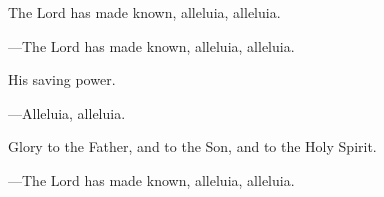 \responsory

\begin{hangpar}
The Lord has made known, alleluia, alleluia.

{\color{red}---\thinspace }The Lord has made known, alleluia, alleluia.

\medskip His saving power.

{\color{red}---\thinspace }Alleluia, alleluia.

\medskip Glory to the Father, and to the Son, and to the Holy Spirit.

{\color{red}---\thinspace }The Lord has made known, alleluia, alleluia.
\end{hangpar}
